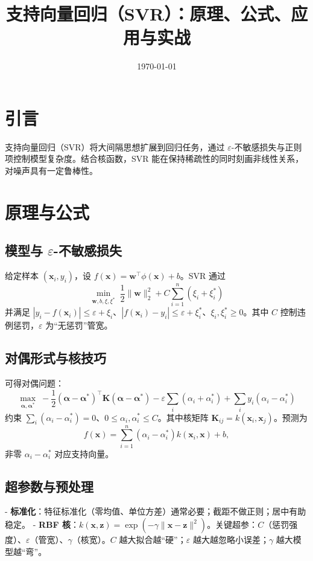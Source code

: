 \documentclass[UTF8,zihao=-4]{ctexart}
\title{支持向量回归（SVR）：原理、公式、应用与实战}
\author{}
\date{\today}
\begin{document}
\maketitle

\section{引言}
支持向量回归（SVR）将大间隔思想扩展到回归任务，通过 \(\varepsilon\)-不敏感损失与正则项控制模型复杂度。结合核函数，SVR 能在保持稀疏性的同时刻画非线性关系，对噪声具有一定鲁棒性。

\section{原理与公式}
\subsection{模型与 \(\varepsilon\)-不敏感损失}
给定样本 \((\mathbf{x}_i,y_i)\)，设 \(f(\mathbf{x})=\mathbf{w}^\top\phi(\mathbf{x})+b\)。SVR 通过
\begin{equation}
\min_{\mathbf{w},b,\xi,\xi^*} \; \frac{1}{2}\lVert\mathbf{w}\rVert_2^2 + C\sum_{i=1}^n (\xi_i+\xi^*_i)
\end{equation}
并满足 \(|y_i - f(\mathbf{x}_i)| \le \varepsilon + \xi_i\)、\(|f(\mathbf{x}_i)-y_i| \le \varepsilon + \xi_i^*\)、\(\xi_i,\xi_i^*\ge 0\)。其中 \(C\) 控制违例惩罚，\(\varepsilon\) 为“无惩罚”管宽。

\subsection{对偶形式与核技巧}
可得对偶问题：
\begin{equation}
\max_{\bm{\alpha},\bm{\alpha}^*} \; -\frac{1}{2}(\bm{\alpha}-\bm{\alpha}^*)^\top \mathbf{K}(\bm{\alpha}-\bm{\alpha}^*) - \varepsilon \sum_i (\alpha_i+\alpha_i^*) + \sum_i y_i(\alpha_i-\alpha_i^*)
\end{equation}
约束 \(\sum_i (\alpha_i-\alpha_i^*)=0\)、\(0\le \alpha_i,\alpha_i^*\le C\)。其中核矩阵 \(\mathbf{K}_{ij}=k(\mathbf{x}_i,\mathbf{x}_j)\)。预测为
\begin{equation}
f(\mathbf{x}) = \sum_{i=1}^n (\alpha_i-\alpha_i^*) k(\mathbf{x}_i,\mathbf{x}) + b,
\end{equation}
非零 \(\alpha_i-\alpha_i^*\) 对应支持向量。

\subsection{超参数与预处理}
- \textbf{标准化}：特征标准化（零均值、单位方差）通常必要；截距不做正则；居中有助稳定。
- \textbf{RBF 核}：\(k(\mathbf{x},\mathbf{z})=\exp(-\gamma\lVert\mathbf{x}-\mathbf{z}\rVert^2)\)。关键超参：\(C\)（惩罚强度）、\(\varepsilon\)（管宽）、\(\gamma\)（核宽）。\(C\) 越大拟合越“硬”；\(\varepsilon\) 越大越忽略小误差；\(\gamma\) 越大模型越“弯”。
\end{document}

